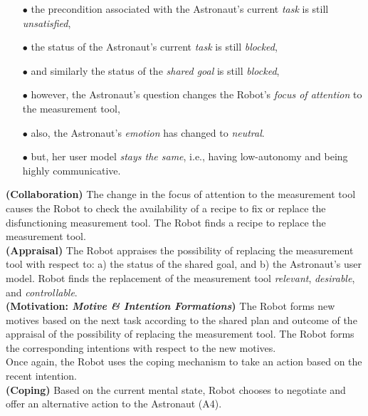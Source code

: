 \begin{itemize}
  \item[$\bullet$] the precondition associated with the Astronaut's current
  \textit{task} is still \textit{unsatisfied},
  \item[$\bullet$] the status of the Astronaut's current \textit{task} is still
  \textit{blocked},
  \item[$\bullet$] and similarly the status of the \textit{shared goal} is
  still \textit{blocked},
  \item[$\bullet$] however, the Astronaut's question changes the Robot's
  \textit{focus of attention} to the measurement tool,
  \item[$\bullet$] also, the Astronaut's \textit{emotion} has changed to
  \textit{neutral}.
  \item[$\bullet$] but, her user model \textit{stays the same}, i.e.,
  having low-autonomy and being highly communicative.
\end{itemize}

\noindent\textbf{(Collaboration)} The change in the focus of attention to the
measurement tool causes the Robot to check the availability of a recipe to fix
or replace the disfunctioning measurement tool. The Robot finds a recipe to
replace the measurement tool.\\

\noindent\textbf{(Appraisal)} The Robot appraises the possibility of
replacing the measurement tool with respect to: a) the status of the shared
goal, and b) the Astronaut's user model. Robot finds the replacement of the
measurement tool \textit{relevant}, \textit{desirable}, and
\textit{controllable}.\\

\noindent\textbf{(Motivation: \textit{Motive \& Intention Formations})} The
Robot forms new motives based on the next task according to the shared plan and
outcome of the appraisal of the possibility of replacing the measurement tool.
The Robot forms the corresponding intentions with respect to the new motives.\\

\noindent Once again, the Robot uses the coping mechanism to take an action
based on the recent intention.\\

\noindent\textbf{(Coping)} Based on the current mental state, Robot
chooses to negotiate and offer an alternative action to the Astronaut (A4).\\

